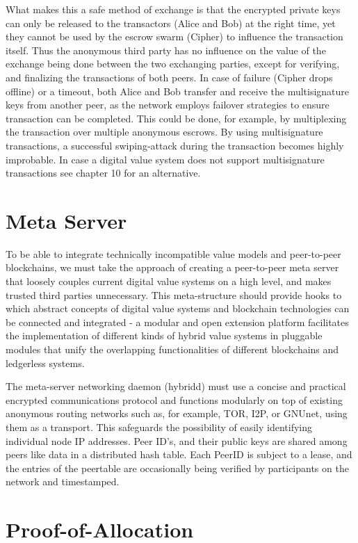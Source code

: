 \documentclass[a4paper]{article}
\begin{document}
What makes this a safe method of exchange is that the encrypted private keys can only be released to the transactors (Alice and Bob) at the right time, yet they cannot be used by the escrow swarm (Cipher) to influence the transaction itself. Thus the anonymous third party has no influence on the value of the exchange being done between the two exchanging parties, except for verifying, and finalizing the transactions of both peers. In case of failure (Cipher drops offline) or a timeout, both Alice and Bob transfer and receive the multisignature keys from another peer, as the network employs failover strategies to ensure transaction can be completed. This could be done, for example, by multiplexing the transaction over multiple anonymous escrows. By using multisignature transactions, a successful swiping-attack during the transaction becomes highly improbable. In case a digital value system does not support multisignature transactions see chapter 10 for an alternative.

\section{Meta Server}
To be able to integrate technically incompatible value models and peer-to-peer blockchains, we must take the approach of creating a peer-to-peer meta server that loosely couples current digital value systems on a high level, and makes trusted third parties unnecessary. This meta-structure should provide hooks to which abstract concepts of digital value systems and blockchain technologies can be connected and integrated - a modular and open extension platform facilitates the implementation of different kinds of hybrid value systems in pluggable modules that unify the overlapping functionalities of different blockchains and ledgerless systems.

The meta-server networking daemon (hybridd) must use a concise and practical encrypted communications protocol and functions modularly  on top of existing anonymous routing networks such as, for example, TOR\cite{tor}, I2P\cite{i2p}, or GNUnet\cite{gnunet}, using them as a transport. This safeguards the possibility of easily identifying individual node IP addresses. Peer ID's, and their public keys are shared among peers like data in a distributed hash table\cite{dht}. Each PeerID is subject to a lease, and the entries of the peertable are occasionally being verified by participants on the network and timestamped.

\section{Proof-of-Allocation}
\end{document}
